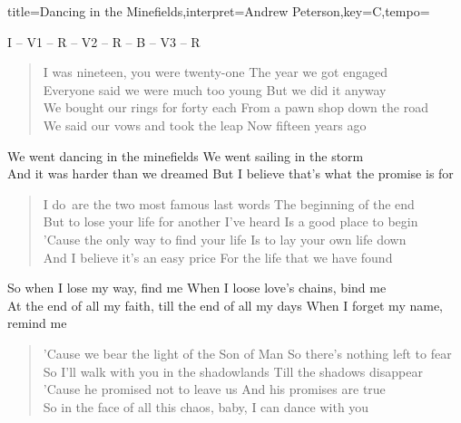 \documentclass{leadsheet-modern}
\begin{document}
\begin{song}{title={Dancing in the Minefields},interpret={Andrew Peterson},key={C},tempo={}}

\begin{schedule}
I -- V1 -- R -- V2 -- R -- B -- V3 -- R
\end{schedule}

\begin{verse}
I was nineteen, you were twenty-one
The year we got engaged \\
Everyone said we were much too young
But we did it anyway \\
We bought our rings for forty each
From a pawn shop down the road \\
We said our vows and took the leap
Now fifteen years ago
\end{verse}

\begin{chorus}
We went dancing in the minefields
We went sailing in the storm \\
And it was harder than we dreamed
But I believe that's what the promise is for
\end{chorus}

\begin{verse}
\frqq I do\flqq~are the two most famous last words
The beginning of the end \\
But to lose your life for another I've heard
Is a good place to begin \\
'Cause the only way to find your life
Is to lay your own life down \\
And I believe it's an easy price
For the life that we have found
\end{verse}

\begin{bridge}
So when I lose my way, find me
When I loose love's chains, bind me \\
At the end of all my faith, till the end of all my days
When I forget my name, remind me
\end{bridge}

\begin{verse}
'Cause we bear the light of the Son of Man
So there's nothing left to fear \\
So I'll walk with you in the shadowlands
Till the shadows disappear \\
'Cause he promised not to leave us
And his promises are true \\
So in the face of all this chaos, baby,
I can dance with you
\end{verse}


\end{song}
\end{document}
